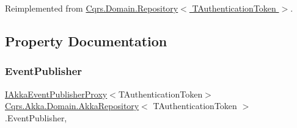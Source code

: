 Reimplemented from \hyperlink{classCqrs_1_1Domain_1_1Repository_aef4df40c39f3edc0f9259089cbd3400e_aef4df40c39f3edc0f9259089cbd3400e}{Cqrs.\+Domain.\+Repository$<$ T\+Authentication\+Token $>$}.



\subsection{Property Documentation}
\mbox{\label{classCqrs_1_1Akka_1_1Domain_1_1AkkaRepository_a52d17021123b6f56b213312351a83d55_a52d17021123b6f56b213312351a83d55}} 
\subsubsection{\texorpdfstring{Event\+Publisher}{EventPublisher}}
{\footnotesize\ttfamily \hyperlink{interfaceCqrs_1_1Akka_1_1Events_1_1IAkkaEventPublisherProxy}{I\+Akka\+Event\+Publisher\+Proxy}$<$T\+Authentication\+Token$>$ \hyperlink{classCqrs_1_1Akka_1_1Domain_1_1AkkaRepository}{Cqrs.\+Akka.\+Domain.\+Akka\+Repository}$<$ T\+Authentication\+Token $>$.Event\+Publisher\hspace{0.3cm}{\ttfamily [get]}, {\ttfamily [protected]}}

